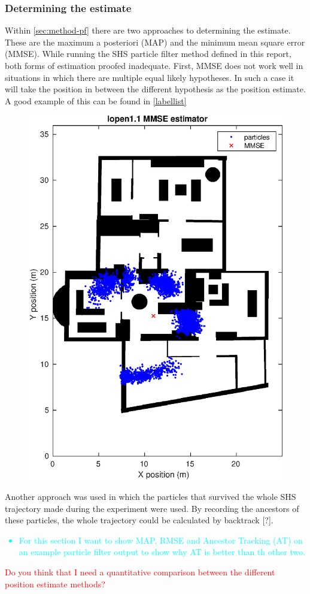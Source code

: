 \subsubsection{Determining the estimate}
Within \cref{sec:method-pf} there are two approaches to determining the estimate. These are the maximum a posteriori (MAP) and the minimum mean square error (MMSE). While running the SHS particle filter method defined in this report, both forms of estimation proofed inadequate.
First, MMSE does not work well in situations in which there are multiple equal likely hypotheses. In such a case it will take the position in between the different hypothesis as the position estimate. A good example of this can be found in \cref{labellist}
\begin{figure}
	\centering
	\includegraphics[width=0.5\linewidth]{images/20201108_1751_lopen1_1_MMSE_estimator}
	\caption{}
	\label{fig:lopen_11_mmse_estimator}
\end{figure}


Another approach was used in which the particles that survived the whole SHS trajectory made during the experiment were used. By recording the ancestors of these particles, the whole trajectory could be calculated by backtrack [\qn ?].

\textcolor{cyan}{
\begin{itemize}
	\item For this section I want to show MAP, RMSE and Ancestor Tracking (AT) on an example particle filter output to show why AT is better than th other two.
\end{itemize}}

\textcolor{red}{Do you think that I need a quantitative comparison between the different position estimate methods?}

